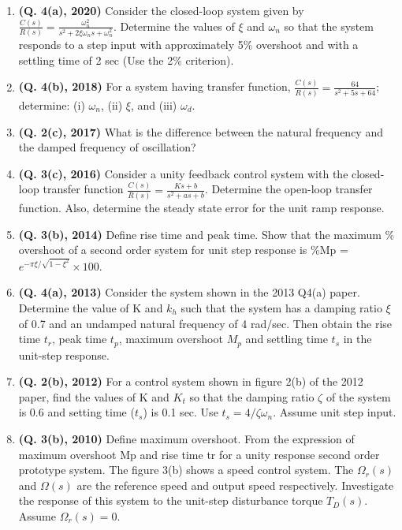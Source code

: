 \documentclass[12pt, a4paper]{article}
\begin{document}
\begin{enumerate}
		\item \textbf{(Q. 4(a), 2020)} Consider the closed-loop system given by $\frac{C(s)}{R(s)} = \frac{\omega_n^2}{s^2 + 2\xi\omega_n s + \omega_n^2}$. Determine the values of $\xi$ and $\omega_n$ so that the system responds to a step input with approximately 5\% overshoot and with a settling time of 2 sec (Use the 2\% criterion).
		\item \textbf{(Q. 4(b), 2018)} For a system having transfer function, $\frac{C(s)}{R(s)} = \frac{64}{s^2+5s+64}$; determine: (i) $\omega_n$, (ii) $\xi$, and (iii) $\omega_d$.
		\item \textbf{(Q. 2(c), 2017)} What is the difference between the natural frequency and the damped frequency of oscillation?
		\item \textbf{(Q. 3(c), 2016)} Consider a unity feedback control system with the closed-loop transfer function $\frac{C(s)}{R(s)} = \frac{Ks+b}{s^2+as+b}$. Determine the open-loop transfer function. Also, determine the steady state error for the unit ramp response.
		\item \textbf{(Q. 3(b), 2014)} Define rise time and peak time. Show that the maximum \% overshoot of a second order system for unit step response is \%Mp = $e^{-\pi\xi/\sqrt{1-\xi^2}} \times 100$.
		\item \textbf{(Q. 4(a), 2013)} Consider the system shown in the 2013 Q4(a) paper. Determine the value of K and $k_h$ such that the system has a damping ratio $\xi$ of 0.7 and an undamped natural frequency of 4 rad/sec. Then obtain the rise time $t_r$, peak time $t_p$, maximum overshoot $M_p$ and settling time $t_s$ in the unit-step response.
		\item \textbf{(Q. 2(b), 2012)} For a control system shown in figure 2(b) of the 2012 paper, find the values of K and $K_t$ so that the damping ratio $\zeta$ of the system is 0.6 and setting time ($t_s$) is 0.1 sec. Use $t_s=4/\zeta\omega_n$. Assume unit step input.
		\item \textbf{(Q. 3(b), 2010)} Define maximum overshoot. From the expression of maximum overshoot Mp and rise time tr for a unity response second order prototype system. The figure 3(b) shows a speed control system. The $\Omega_r(s)$ and $\Omega(s)$ are the reference speed and output speed respectively. Investigate the response of this system to the unit-step disturbance torque $T_D(s)$. Assume $\Omega_r(s)=0$.
	\end{enumerate}
	
	
\end{document}
